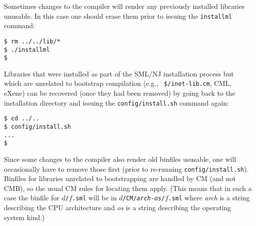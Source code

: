 Sometimes changes to the compiler will render any previously installed
libraries unusable.  In this case one should erase them prior to
issuing the {\tt installml} command:

\begin{verbatim}
$ rm ../../lib/*
$ ./installml
$
\end{verbatim}

Libraries that were installed as part of the SML/NJ installation
process but which are unrelated to bootstrap compilation (e.g., {\tt
\$/inet-lib.cm}, CML, eXene) can be recovered (once they had been
removed) by going back to the installation directory and issuing the
{\tt config/install.sh} command again:

\begin{verbatim}
$ cd ../..
$ config/install.sh
...
$
\end{verbatim}

Since some changes to the compiler also render old binfiles ususable,
one will occasionally have to remove those first (prior to re-running
{\tt config/install.sh}).  Binfiles for libraries unrelated to
bootstrapping are handled by CM (and not CMB), so the usual CM rules
for locating them apply.  (This means that in such a case the binfile
for {\tt $d$/$f$.sml} will be in
{\tt $d$/CM/{\it arch}-{\it os}/$f$.sml}
where {\it arch} is a string describing the CPU
architecture and {\it os} is a string describing the operating system
kind.)
